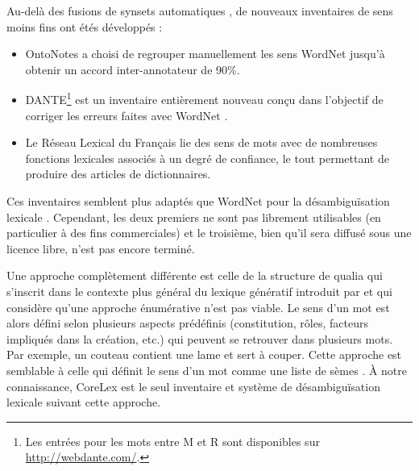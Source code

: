 Au-delà des fusions de synsets automatiques \citep{snow2007learning}, de
nouveaux inventaires de sens moins fins ont étés développés :

\begin{itemize}

    \item OntoNotes \citep{hovy2006ontonotes} a choisi de regrouper
        manuellement les sens WordNet jusqu'à obtenir un accord
        inter-annotateur de 90\%.

    \item DANTE\footnote{Les entrées pour les mots entre M et R sont
        disponibles sur \url{http://webdante.com/}.} \citep{mccarthy2010dante} est un
        inventaire entièrement nouveau conçu dans l'objectif de corriger les
        erreurs faites avec WordNet \citep{kilgarriff2010detailed}.

    \item Le Réseau Lexical du Français \citep{polguere2014principes} lie des sens de
        mots avec de nombreuses fonctions lexicales associés à un degré de
        confiance, le tout permettant de produire des articles de dictionnaires.

\end{itemize}

Ces inventaires semblent plus adaptés que WordNet pour la désambiguïsation
lexicale \citep{navigli2012quick}. Cependant, les deux premiers ne sont pas
librement utilisables (en particulier à des fins commerciales) et le troisième,
bien qu'il sera diffusé sous une licence libre, n'est pas encore terminé.

Une approche complètement différente est celle de la structure de qualia
\citep{johnston1996qualia} qui s'inscrit dans le contexte plus général du
lexique génératif introduit par \cite{pustejovsky1991generative} et qui
considère qu'une approche énumérative n'est pas viable. Le sens d'un mot est
alors défini selon plusieurs aspects prédéfinis (constitution, rôles, facteurs
impliqués dans la création, etc.) qui peuvent se retrouver dans plusieurs mots.
Par exemple, un couteau contient une lame et sert à couper. Cette approche est
semblable à celle qui définit le sens d'un mot comme une liste de sèmes
\citep{rastier1987semantique}. À notre connaissance, CoreLex
\citep{buitelaar1998corelex} est le seul inventaire et système de
désambiguïsation lexicale suivant cette approche.

